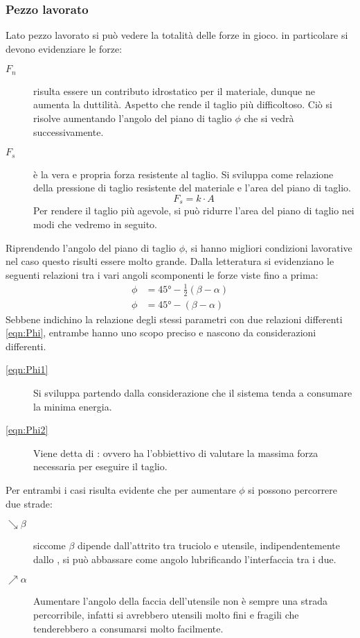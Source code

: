 \subsubsection*{Pezzo lavorato}
Lato pezzo lavorato si può vedere la totalità delle forze in gioco.
in particolare si devono evidenziare le forze:
\begin{description}
\item[$F_n$] risulta essere un contributo idrostatico per il materiale, dunque ne aumenta la 
duttilità. Aspetto che rende il taglio più difficoltoso. 
Ciò si risolve aumentando l'angolo del piano di taglio $\phi$ che si vedrà successivamente.
\item[$F_s$] è la vera e propria forza resistente al taglio. Si sviluppa come relazione della 
pressione di taglio resistente del materiale e l'area del piano di taglio.
\begin{equation}
F_s = k \cdot A
\end{equation}
Per rendere il taglio più agevole, si può ridurre l'area del piano di taglio nei modi che vedremo in seguito.
\end{description}

Riprendendo l'angolo del piano di taglio $\phi$, si hanno migliori condizioni lavorative
nel caso questo risulti essere molto grande.
Dalla letteratura si evidenziano le seguenti relazioni tra i vari angoli scomponenti le 
forze viste fino a prima:
\begin{subequations}
\label{eqn:Phi}
\begin{align}
\phi &= 45\unit{\degree} - \frac{1}{2}(\beta - \alpha) \label{eqn:Phi1}\\
\phi &= 45\unit{\degree} - (\beta - \alpha)\label{eqn:Phi2}
\end{align}
\end{subequations}
Sebbene indichino la relazione degli stessi parametri con due relazioni differenti \eqref{eqn:Phi}, entrambe hanno uno scopo preciso e nascono da considerazioni differenti.

\begin{description}
\item[\eqref{eqn:Phi1}] Si sviluppa partendo dalla considerazione che il sistema tenda
a consumare la minima energia.
\item[\eqref{eqn:Phi2}] Viene detta di : ovvero ha l'obbiettivo di valutare
la massima forza necessaria per eseguire il taglio.
\end{description}

Per entrambi i casi risulta evidente che per aumentare $\phi$ si possono percorrere due strade:
\begin{description}
\item[$\searrow \beta$] siccome $\beta$ dipende dall'attrito tra truciolo e utensile, 
indipendentemente dallo , si può abbassare come angolo lubrificando 
l'interfaccia tra i  due.
\item[$\nearrow \alpha$] Aumentare l'angolo della faccia dell'utensile non è sempre una strada
percorribile, infatti si avrebbero utensili molto fini e fragili che tenderebbero a consumarsi
molto facilmente.
\end{description}

